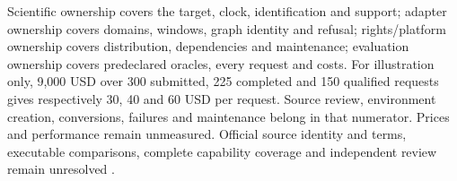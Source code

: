 Scientific ownership covers the target, clock, identification and support;
adapter ownership covers domains, windows, graph identity and refusal;
rights/platform ownership covers distribution, dependencies and maintenance;
evaluation ownership covers predeclared oracles, every request and costs.
For illustration only, 9,000 USD over 300 submitted, 225 completed and
150 qualified requests gives respectively 30, 40 and 60 USD per request.
Source review, environment creation, conversions, failures and maintenance
belong in that numerator. Prices and performance remain unmeasured.
Official source identity and terms, executable comparisons, complete capability coverage and independent review remain unresolved
\cite{exec24_banjo_choice}.
